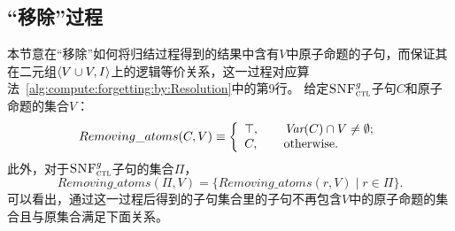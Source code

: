 \subsection{“移除”过程}
\label{sec:remV}
本节意在“移除”如何将归结过程得到的结果中含有$V$中原子命题的子句，而保证其在二元组${\langle{V\cup V, I}\rangle}$上的逻辑等价关系，这一过程对应算法~\ref{alg:compute:forgetting:by:Resolution}中的第9行。
给定${\textsc{SNF}_{\textsc{ctl}}^g}$子句$C$和原子命题的集合$V$：
\[Removing\_atoms(C, V) \equiv
\left\{
\begin{array}{ll}
	\top, \qquad \hbox{$\textit{Var}(C) \cap V \not = \emptyset$;} \\
	C,  \qquad  \hbox{otherwise.}
\end{array}
\right.
\]
此外，对于${\textsc{SNF}_{\textsc{ctl}}^g}$子句的集合$\Pi$，
\[Removing\_atoms(\Pi, V) = \{Removing\_atoms(r, V) \mid r \in \Pi\}.\]
可以看出，通过这一过程后得到的子句集合里的子句不再包含$V$中的原子命题的集合且与原集合满足下面关系。

